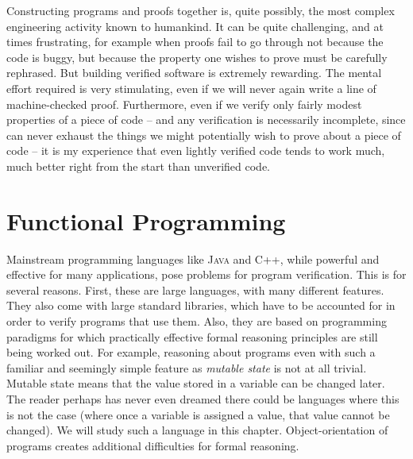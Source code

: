 \documentclass{book}[12pt]
\begin{document}
Constructing programs and proofs together is, quite possibly, the most
complex engineering activity known to humankind.  It can be quite
challenging, and at times frustrating, for example when proofs fail to
go through not because the code is buggy, but because the property one
wishes to prove must be carefully rephrased.  But building verified
software is extremely rewarding.  The mental effort required is very
stimulating, even if we will never again write a line of
machine-checked proof.  Furthermore, even if we verify only fairly
modest properties of a piece of code -- and any verification is
necessarily incomplete, since can never exhaust the things we might
potentially wish to prove about a piece of code -- it is my experience
that even lightly verified code tends to work much, much better right
from the start than unverified code.  

\section{Functional Programming}

Mainstream programming languages like \textsc{Java} and \textsc{C++},
while powerful and effective for many applications, pose problems for
program verification.  This is for several reasons.  First, these are
large languages, with many different features.  They also come with
large standard libraries, which have to be accounted for in order to
verify programs that use them.  Also, they are based on programming
paradigms for which practically effective formal reasoning principles
are still being worked out.  For example, reasoning about programs
even with such a familiar and seemingly simple feature as
\emph{mutable state} is not at all trivial.  Mutable state means that
the value stored in a variable can be changed later.  The reader
perhaps has never even dreamed there could be languages where this is
not the case (where once a variable is assigned a value, that value
cannot be changed).  We will study such a language in this chapter.
Object-orientation of programs creates additional difficulties for
formal reasoning.
\end{document}
